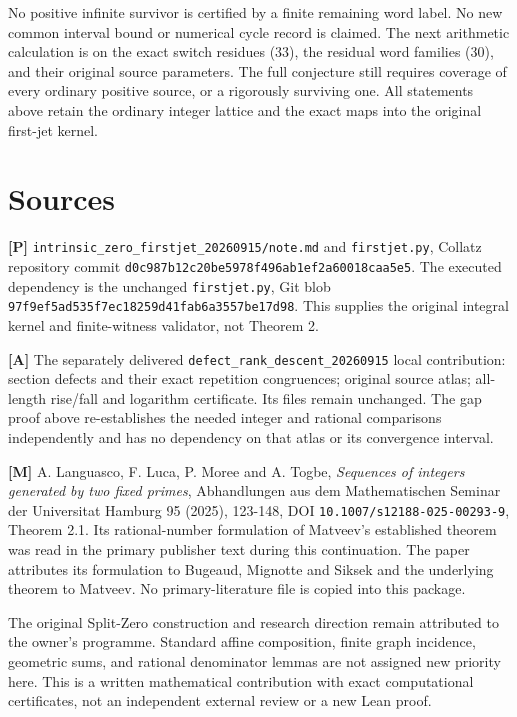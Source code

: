 No positive infinite survivor is certified by a finite remaining word
label. No new common interval bound or numerical cycle record is
claimed. The next arithmetic calculation is on the exact switch residues
(33), the residual word families (30), and their original source
parameters. The full conjecture still requires coverage of every
ordinary positive source, or a rigorously surviving one. All statements
above retain the ordinary integer lattice and the exact maps into the
original first-jet kernel.

\section{Sources}

\textbf{{[}P{]}} \nolinkurl{intrinsic_zero_firstjet_20260915/note.md}
and \nolinkurl{firstjet.py}, Collatz repository commit
\nolinkurl{d0c987b12c20be5978f496ab1ef2a60018caa5e5}. The executed
dependency is the unchanged \nolinkurl{firstjet.py}, Git blob
\nolinkurl{97f9ef5ad535f7ec18259d41fab6a3557be17d98}. This supplies the
original integral kernel and finite-witness validator, not Theorem 2.

\textbf{{[}A{]}} The separately delivered
\nolinkurl{defect_rank_descent_20260915} local contribution: section
defects and their exact repetition congruences; original source atlas;
all-length rise/fall and logarithm certificate. Its files remain
unchanged. The gap proof above re-establishes the needed integer and
rational comparisons independently and has no dependency on that atlas
or its convergence interval.

\textbf{{[}M{]}} A. Languasco, F. Luca, P. Moree and A. Togbe,
\emph{Sequences of integers generated by two fixed primes}, Abhandlungen
aus dem Mathematischen Seminar der Universitat Hamburg 95 (2025),
123-148, DOI \nolinkurl{10.1007/s12188-025-00293-9}, Theorem 2.1. Its
rational-number formulation of Matveev's established theorem was read in
the primary publisher text during this continuation. The paper
attributes its formulation to Bugeaud, Mignotte and Siksek and the
underlying theorem to Matveev. No primary-literature file is copied into
this package.

The original Split-Zero construction and research direction remain
attributed to the owner's programme. Standard affine composition, finite
graph incidence, geometric sums, and rational denominator lemmas are not
assigned new priority here. This is a written mathematical contribution
with exact computational certificates, not an independent external
review or a new Lean proof.
